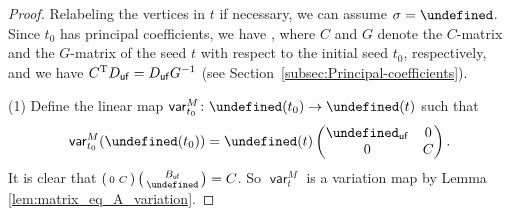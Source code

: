 \documentclass[10pt,a4paper]{amsart}
\newcommand{\opname}[1]{\operatorname{\mathsf{#1}}}
\newcommand{\var}{\opname{var}}
\newcommand{\ufv}{\opname{uf}}
\let\Mc\undefined
\let\Id\undefined
\let\ff\undefined
\let\uff\undefined
\newcommand{\Mc}{M^\circ}
\newcommand{\Id}{{\opname{Id}}}
\newcommand{\ff}{\mathbf{f}}
\newcommand{\uff}{\underline{\ff}}
\numberwithin{equation}{section}
\begin{document}
\begin{proof}
Relabeling the vertices in $t$ if necessary, we can assume $\sigma=\Id$.
Since $t_{0}$ has principal coefficients, we have \smash{$B(t)=\left(\begin{smallmatrix}
B_{\ufv} & -G^{-1}\\
C & 0
\end{smallmatrix}\right)$}, where $C$ and $G$ denote the $C$-matrix and the $G$-matrix of
the seed $t$ with respect to the initial seed $t_{0}$, respectively,
and we have $C^{\rm T}D_{\ufv}=D_{\ufv}G^{-1}$ (see Section~\ref{subsec:Principal-coefficients}).

(1) Define the linear map $\var_{t_{0}}^{M}\colon\Mc(t_{0})\rightarrow\Mc(t)$
such that{\samepage
\begin{align*}
\var_{t_{0}}^{M}(\uff(t_{0})) =\uff(t)\begin{pmatrix}
\Id_{\ufv} & 0\\
0 & C
\end{pmatrix}.
\end{align*}
It is clear that $\left(\begin{smallmatrix}
0 & C\end{smallmatrix}\right)\left(\begin{smallmatrix}
B_{\ufv}\\
\Id
\end{smallmatrix}\right)=C$. So $\var_{t}^{M}$ is a variation map by Lemma \ref{lem:matrix_eq_A_variation}.}


\end{proof}
\end{document}
